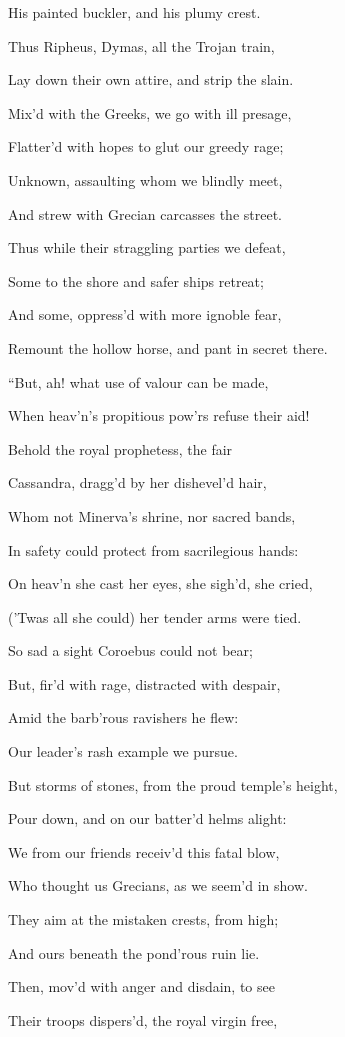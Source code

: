 His painted buckler, and his plumy crest.

Thus Ripheus, Dymas, all the Trojan train,

Lay down their own attire, and strip the slain.

Mix’d with the Greeks, we go with ill presage,

Flatter’d with hopes to glut our greedy rage;

Unknown, assaulting whom we blindly meet,

And strew with Grecian carcasses the street.

Thus while their straggling parties we defeat,

Some to the shore and safer ships retreat;

And some, oppress’d with more ignoble fear,

Remount the hollow horse, and pant in secret there.

“But, ah! what use of valour can be made,

When heav’n’s propitious pow’rs refuse their aid!

Behold the royal prophetess, the fair

Cassandra, dragg’d by her dishevel’d hair,

Whom not Minerva’s shrine, nor sacred bands,

In safety could protect from sacrilegious hands:

On heav’n she cast her eyes, she sigh’d, she cried,

(’Twas all she could) her tender arms were tied.

So sad a sight Coroebus could not bear;

But, fir’d with rage, distracted with despair,

Amid the barb’rous ravishers he flew:

Our leader’s rash example we pursue.

But storms of stones, from the proud temple’s height,

Pour down, and on our batter’d helms alight:

We from our friends receiv’d this fatal blow,

Who thought us Grecians, as we seem’d in show.

They aim at the mistaken crests, from high;

And ours beneath the pond’rous ruin lie.

Then, mov’d with anger and disdain, to see

Their troops dispers’d, the royal virgin free,

